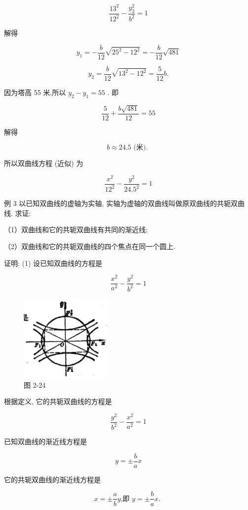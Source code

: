 \documentclass[lang=cn,newtx,10pt,scheme=chinese]{elegantbook}
\begin{document}
\[
  \frac{{13}^{2}}{{12}^{2}} - \frac{{y}_{2}^{2}}{{b}^{2}} = 1
\]

解得

\[
    {y}_{1} = - \frac{b}{12}\sqrt{{25}^{2} - {12}^{2}} = - \frac{b}{12}\sqrt{481}
\]

\[
    {y}_{2} = \frac{b}{12}\sqrt{{13}^{2} - {12}^{2}} = \frac{5}{12}b.
\]

因为塔高 55 米,所以 \({y}_{2} - {y}_{1} = {55}\) . 即

\[
  \frac{5}{12} + \frac{b\sqrt{481}}{12} = {55}
\]

解得

\[
  b \approx {24.5}\text{ (米). }
\]

所以双曲线方程 (近似) 为

\[
  \frac{{x}^{2}}{{12}^{2}} - \frac{{y}^{2}}{{24.5}^{2}} = 1
\]

例 3 以已知双曲线的虚轴为实轴, 实轴为虚轴的双曲线叫做原双曲线的共轭双曲线. 求证:

（1）双曲线和它的共轭双曲线有共同的渐近线;

（2）双曲线和它的共轭双曲线的四个焦点在同一个圆上.

证明: (1) 设已知双曲线的方程是

\[
  \frac{{x}^{2}}{{a}^{2}} - \frac{{y}^{2}}{{b}^{2}} = 1
\]

\begin{figure}[h]
  \centering
  \includegraphics[max width=0.4\textwidth]{images/01912cc2-ffb6-728e-9ae7-b113ff05c64b_104_706159.jpg}
  \caption{图 2-24}
\end{figure}



根据定义, 它的共轭双曲线的方程是

\[
  \frac{{y}^{2}}{{b}^{2}} - \frac{{x}^{2}}{{a}^{2}} = 1
\]

已知双曲线的渐近线方程是

\[
  y = \pm \frac{b}{a}x
\]

它的共轭双曲线的渐近线方程是

\[
  x = \pm \frac{a}{b}y\text{,即 }y = \pm \frac{b}{a}x\text{. }
\]
\end{document}
